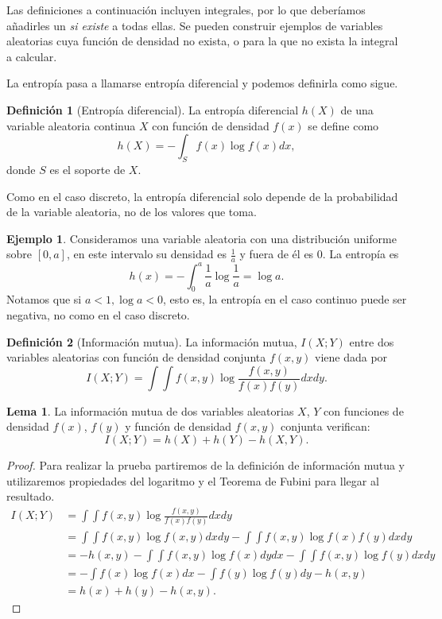 \documentclass[10pt,a4paper]{article} %
\theoremstyle{definition}
\newtheorem{definition}{Definición}[section]
\newtheorem{lemma}[theorem]{Lema}
\newtheorem{example}[theorem]{Ejemplo}
\begin{document}
Las definiciones a continuación incluyen integrales, por lo que deberíamos añadirles un \textit{si existe} a todas ellas. Se pueden construir ejemplos de variables aleatorias cuya función de densidad no exista, o para la que no exista la integral a calcular.

La entropía pasa a llamarse entropía diferencial y podemos definirla como sigue.

\begin{definition}[Entropía diferencial]
  La entropía diferencial $h(X)$ de una variable aleatoria continua $X$ con función de densidad $f(x)$ se define como\[
h(X) = - \int_Sf(x)\log f(x)dx,
\]
donde $S$ es el soporte de $X$.
\end{definition}
Como en el caso discreto, la entropía diferencial solo depende de la probabilidad de la variable aleatoria, no de los valores que toma. 

\begin{example}\label{ej:uni} Consideramos una variable aleatoria con una distribución uniforme sobre $[0,a]$, en este intervalo su densidad es $\frac{1}{a}$ y fuera de él es 0. La entropía es \[
h(x) = - \int_0^a\frac{1}{a}\log\frac{1}{a} = \log a.
  \]
Notamos que si $a<1, \log a < 0$, esto es, la entropía en el caso continuo puede ser negativa, no como en el caso discreto.
  
\end{example}

\begin{definition}[Información mutua]
  La información mutua, $I(X;Y)$ entre dos variables aleatorias con función de densidad conjunta $f(x,y)$ viene dada por\[
I(X;Y) = \int \int f(x,y) \log \frac{f(x,y)}{f(x)f(y)}dxdy.
  \]
\end{definition}

\begin{lemma}\label{l:ent_im}
  La información mutua de dos variables aleatorias $X$, $Y$ con funciones de densidad $f(x)$, $f(y)$ y función de densidad $f(x,y)$ conjunta verifican:\[
  I(X;Y) = h(X) + h(Y) - h(X,Y).
  \]
\end{lemma}

\begin{proof}
  Para realizar la prueba partiremos de la definición de información mutua y utilizaremos propiedades del logaritmo y el Teorema de Fubini para llegar al resultado.
  \begin{align*}
    I(X;Y) &= \int \int f(x,y) \log \frac{f(x,y)}{f(x)f(y)}dxdy \\
    &= \int \int f(x,y) \log f(x,y)dxdy - \int \int f(x,y) \log f(x)f(y)dxdy\\
    &= -h(x,y)-\int\int f(x,y) \log f(x) dy dx - \int \int f(x,y)\log f(y)dxdy\\
    &= -\int f(x) \log f(x)dx - \int f(y)\log f(y) dy -h(x,y)\\
    &= h(x) + h(y) - h(x,y).
  \end{align*}
\end{proof}
\end{document}
